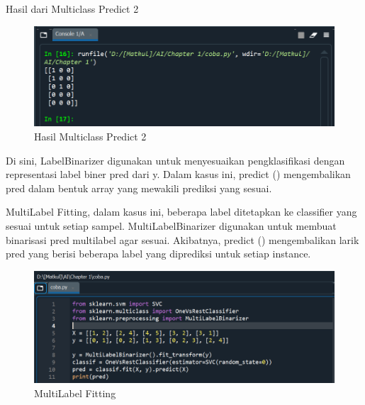 \par Hasil dari Multiclass Predict 2

    \begin{figure}[H]
    \centering
    \includegraphics[width=13cm]{figures/chapter1/29.PNG}
    \caption{Hasil Multiclass Predict 2}
    \end{figure}

\par Di sini, LabelBinarizer digunakan untuk menyesuaikan pengklasifikasi dengan representasi label biner pred dari y. Dalam kasus ini, predict () mengembalikan pred dalam bentuk array yang mewakili prediksi yang sesuai.

\par MultiLabel Fitting, dalam kasus ini, beberapa label ditetapkan ke classifier yang sesuai untuk setiap sampel. MultiLabelBinarizer digunakan untuk membuat binarisasi pred multilabel agar sesuai. Akibatnya, predict () mengembalikan larik pred yang berisi beberapa label yang diprediksi untuk setiap instance.

    \begin{figure}[H]
    \centering
    \includegraphics[width=13cm]{figures/chapter1/30.PNG}
    \caption{MultiLabel Fitting}
    \end{figure}

